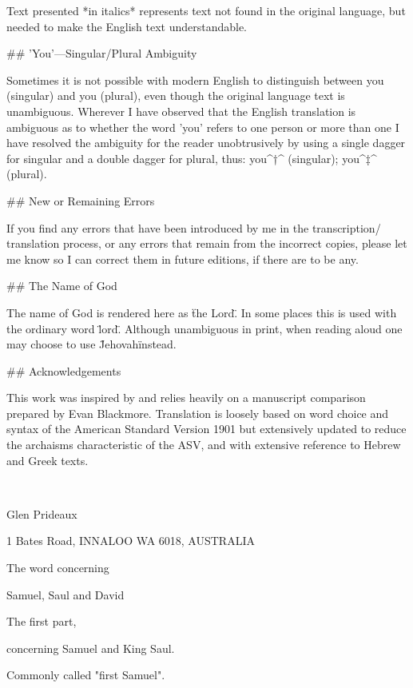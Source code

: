 Text presented *in italics* represents text not found in the original
language, but needed to make the English text understandable.

## 'You'---Singular/Plural Ambiguity

Sometimes it is not possible with modern English to distinguish between
you (singular) and you (plural), even though the original language text
is unambiguous. Wherever I have observed that the English translation is
ambiguous as to whether the word 'you' refers to one person or more than
one I have resolved the ambiguity for the reader unobtrusively by using
a single dagger for singular and a double dagger for plural, thus:
you^†^ (singular); you^‡^ (plural).

## New or Remaining Errors

If you find any errors that have been introduced by me in the
transcription/ translation process, or any errors that remain from the
incorrect copies, please let me know so I can correct them in future
editions, if there are to be any.

## The Name of God

The name of God is rendered here as \"the Lord\". In some places this is
used with the ordinary word \"lord\". Although unambiguous in print,
when reading aloud one may choose to use \"Jehovah\" instead.

## Acknowledgements

This work was inspired by and relies heavily on a manuscript comparison
prepared by Evan Blackmore. Translation is loosely based on word choice
and syntax of the American Standard Version 1901 but extensively updated
to reduce the archaisms characteristic of the ASV, and with extensive
reference to Hebrew and Greek texts.

\

Glen Prideaux

1 Bates Road, INNALOO WA 6018, AUSTRALIA

The word concerning

Samuel, Saul and David

The first part,

concerning Samuel and King Saul.

Commonly called "first Samuel".


